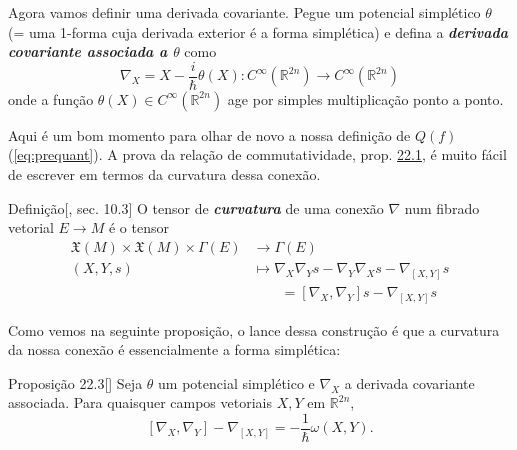 Agora vamos definir uma derivada covariante. Pegue um potencial simplético $\theta$ (= uma 1-forma cuja derivada exterior é a forma simplética) e defina a \textit{\textbf{derivada covariante associada a $\theta$}} como
\[\nabla_X=X-\frac{i}{\hslash}\theta(X):C^\infty(\mathbb{R}^{2n})\longrightarrow C^\infty(\mathbb{R}^{2n})\]
onde a função $\theta(X)\in C^\infty(\mathbb{R}^{2n})$ age por simples multiplicação ponto a ponto. 

Aqui é um bom momento para olhar de novo a nossa definição de $Q(f)$ (\cref{eq:prequant}). A prova da relação de commutatividade, prop. \hyperref[prop:22.1]{22.1}, é muito fácil de escrever em termos da curvatura dessa conexão.

\begin{thing3}{Definição}[\cite{tu-diff}, sec. 10.3]\leavevmode
	O tensor de \textit{\textbf{curvatura}} de uma conexão $\nabla$ num fibrado vetorial $E \to M$ é o tensor
	\begin{align*}
		\mathfrak{X}(M)\times\mathfrak{X}(M)\times\Gamma(E) &\longrightarrow \Gamma(E) \\
		(X,Y,s)\qquad  &\longmapsto \nabla_X\nabla_Ys-\nabla_Y\nabla_Xs -\nabla_{[X,Y]}s\\&\qquad =[\nabla_X,\nabla_Y]s-\nabla_{[X,Y]}s
	\end{align*}
\end{thing3}

Como vemos na seguinte proposição, o lance dessa construção é que a curvatura da nossa conexão é essencialmente a forma simplética:

\begin{thing4}{Proposição 22.3}[\cite{hallq}]\label{prop:22.3}\leavevmode
	Seja $\theta$ um potencial simplético e $\nabla_X$ a derivada covariante associada. Para quaisquer campos vetoriais $X,Y$ em  $\mathbb{R}^{2n}$,
	\[[\nabla_X,\nabla_Y]-\nabla_{[X,Y]}=-\frac{1}{\hslash}\omega(X,Y).\]
\end{thing4}

